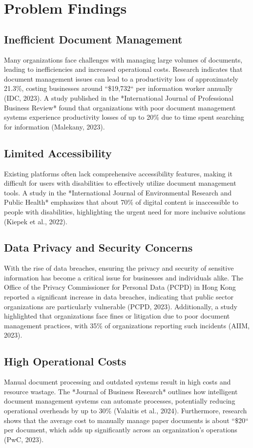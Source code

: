 \section{Problem Findings}

\subsection{Inefficient Document Management}
Many organizations face challenges with managing large volumes of documents, leading to inefficiencies and increased operational costs. Research indicates that document management issues can lead to a productivity loss of approximately 21.3\%, costing businesses around ``\$19,732`` per information worker annually (IDC, 2023). A study published in the *International Journal of Professional Business Review* found that organizations with poor document management systems experience productivity losses of up to 20\% due to time spent searching for information (Malekany, 2023).

\subsection{Limited Accessibility}
Existing platforms often lack comprehensive accessibility features, making it difficult for users with disabilities to effectively utilize document management tools. A study in the *International Journal of Environmental Research and Public Health* emphasizes that about 70\% of digital content is inaccessible to people with disabilities, highlighting the urgent need for more inclusive solutions (Kiepek et al., 2022).

\subsection{Data Privacy and Security Concerns}
With the rise of data breaches, ensuring the privacy and security of sensitive information has become a critical issue for businesses and individuals alike. The Office of the Privacy Commissioner for Personal Data (PCPD) in Hong Kong reported a significant increase in data breaches, indicating that public sector organizations are particularly vulnerable (PCPD, 2023). Additionally, a study highlighted that organizations face fines or litigation due to poor document management practices, with 35\% of organizations reporting such incidents (AIIM, 2023).

\subsection{High Operational Costs}
Manual document processing and outdated systems result in high costs and resource wastage. The *Journal of Business Research* outlines how intelligent document management systems can automate processes, potentially reducing operational overheads by up to 30\% (Valaitis et al., 2024). Furthermore, research shows that the average cost to manually manage paper documents is about ``\$20`` per document, which adds up significantly across an organization’s operations (PwC, 2023).

